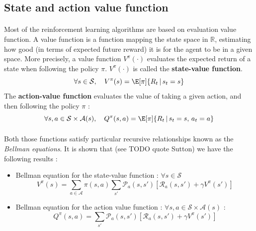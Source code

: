\documentclass[a4paper]{report}
\begin{document}
{{			\subsection{State and action value function}
			{
				\paragraph{} Most of the reinforcement learning algorithms are based on evaluation value function. A value function is a function mapping the state space in $\mathbb{R}$, estimating how good (in terms of expected future reward) it is for the agent to be in a given space. More precisely, a value function $V^\pi(\cdot)$ evaluates the expected return of a state when following the policy $\pi$. $V^\pi(\cdot)$ is called the \textbf{state-value function}. 
				\begin{equation}
					\forall{s}\in\mathcal{S}, \quad V^\pi(s) = \E[\pi]{R_t \, \vert \, s_t = s}
				\end{equation}
				The \textbf{action-value function} evaluates the value of taking a given action, and then following the policy $\pi$ : 
				\begin{equation}
					\forall{s,a}\in\mathcal{S}\times\mathcal{A}(s), \quad Q^\pi(s,a) = \E[\pi]{ R_t \, \vert \, s_t=s, \, a_t=a}
				\end{equation}
				
				\paragraph{} Both those functions satisfy particular recursive relationships known as the \emph{Bellman equations}. It is shown that (see TODO quote Sutton) we have the following results : 
				\vspace{10pt}
				
				{
					\begin{itemize}[label=$\triangleright$]
						\item Bellman equation for the state-value function : $\forall s \in\mathcal{S}$ 
						\begin{equation}
							V^\pi(s) = \sum_{a\in\mathcal{A}}\pi(s,a)\sum_{s'} \mathcal{P}_a(s,s')\left[\mathcal{R}_a(s,s') + \gamma V^\pi(s')\right]
						\end{equation}
						\item Bellman equation for the action value function : $\forall{s,a}\in\mathcal{S}\times\mathcal{A}(s)$ : 
						\begin{equation}
							Q^\pi(s,a) = \sum_{s'}\mathcal{P}_a(s,s')\left[ \mathcal{R}_a(s,s') + \gamma V^\pi(s')\right]
						\end{equation}
					\end{itemize}
				}
			}
}}
\end{document}
